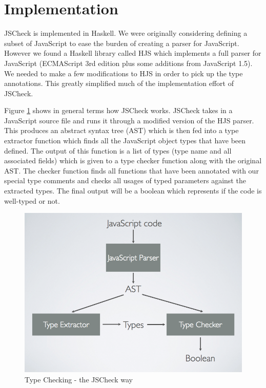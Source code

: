 \documentclass{article}
\begin{document}
\section{Implementation}
\label{sec:implementation}
JSCheck is implemented in Haskell. We were originally considering defining a 
subset of JavaScript to ease the burden of creating a parser for JavaScript. 
However we found a Haskell library called HJS \cite{hjsLibrary} 
which implements a full parser for JavaScript (ECMAScript 3rd edition plus 
some additions from JavaScript 1.5). We needed to make a few modifications to
HJS in order to pick up the type annotations. This greatly simplified much of
the implementation effort of JSCheck.

Figure \ref{fig:jscheckway} shows in general terms how JSCheck works. JSCheck takes 
in a JavaScript source file and runs
it through a modified version of the HJS parser. This produces an abstract syntax tree
(AST) which is then fed into a type extractor function which finds all the JavaScript 
object types that
have been defined. The output of this function is a list of types 
(type name and all associated fields)
which is given to a type checker function along with the original AST. The
checker function finds all functions that have been annotated with our special
type comments and checks all usages of typed parameters against the extracted types.
The final 
output will be a boolean which represents if the code is well-typed or not. 

\begin{figure}[here]
  \begin{center}
    \includegraphics[scale=0.4]{blockdiagram.png}
  \end{center}
  \caption{Type Checking - the JSCheck way}
  \label{fig:jscheckway}
\end{figure}
\pagebreak
\end{document}
